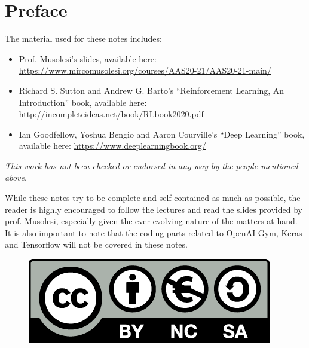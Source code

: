 \tableofcontents
\clearpage
\addemptypage

\listofalgorithms
\clearpage
\addemptypage

\listoffigures
\clearpage
\addemptypage

\chapter*{Preface}

The material used for these notes includes:
\begin{itemize}
    \item Prof. Musolesi's slides, available here: \url{https://www.mircomusolesi.org/courses/AAS20-21/AAS20-21-main/}
    \item Richard S. Sutton and Andrew G. Barto's ``Reinforcement Learning, An Introduction'' book, available here: \url{http://incompleteideas.net/book/RLbook2020.pdf}
    \item Ian Goodfellow, Yoshua Bengio and Aaron Courville's ``Deep Learning'' book, available here: \url{https://www.deeplearningbook.org/}
\end{itemize}

\emph{This work has not been checked or endorsed in any way by the people mentioned above}.

While these notes try to be complete and self-contained as much as possible, the reader is highly encouraged to follow the lectures and read the slides provided by prof. Musolesi, especially given the ever-evolving nature of the matters at hand. It is also important to note that the coding parts related to OpenAI Gym, Keras and Tensorflow will not be covered in these notes.

\begin{figure}
\centering
\includegraphics[width=.9\linewidth]{Images/by-nc-sa.eu.png}
\end{figure}

